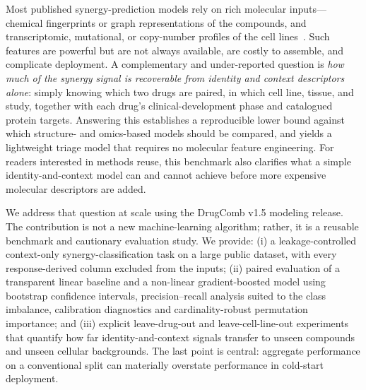 \documentclass{bmcart}
\begin{document}
Most published synergy-prediction models rely on rich molecular inputs---chemical fingerprints or
graph representations of the compounds, and transcriptomic, mutational, or copy-number profiles of the
cell lines~\cite{preuer2018,menden2019}. Such features are powerful but are not always available, are
costly to assemble, and complicate deployment. A complementary and under-reported question is
\emph{how much of the synergy signal is recoverable from identity and context descriptors alone}:
simply knowing which two drugs are paired, in which cell line, tissue, and study, together with each
drug's clinical-development phase and catalogued protein targets. Answering this establishes a
reproducible lower bound against which structure- and omics-based models should be compared, and
yields a lightweight triage model that requires no molecular feature engineering. For readers
interested in methods reuse, this benchmark also clarifies what a simple identity-and-context
model can and cannot achieve before more expensive molecular descriptors are added.

We address that question at scale using the DrugComb v1.5 modeling release. The contribution is not a
new machine-learning algorithm; rather, it is a reusable benchmark and cautionary evaluation study. We
provide: (i) a leakage-controlled context-only synergy-classification task on a large public dataset,
with every response-derived column excluded from the inputs; (ii) paired evaluation of a transparent
linear baseline and a non-linear gradient-boosted model using bootstrap confidence intervals,
precision--recall analysis suited to the class imbalance, calibration diagnostics and
cardinality-robust permutation importance; and (iii) explicit leave-drug-out and leave-cell-line-out
experiments that quantify how far identity-and-context signals transfer to unseen compounds and
unseen cellular backgrounds. The last point is central: aggregate performance on a conventional split
can materially overstate performance in cold-start deployment.
\end{document}
